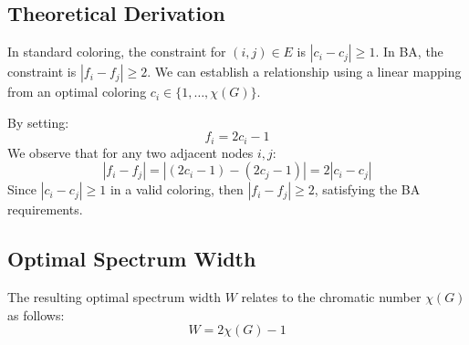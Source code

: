 \documentclass{article}
\begin{document}
\subsection{Theoretical Derivation}
In standard coloring, the constraint for $(i, j) \in E$ is $|c_i - c_j| \ge 1$. In BA, the constraint is $|f_i - f_j| \ge 2$. We can establish a relationship using a linear mapping from an optimal coloring $c_i \in \{1, \dots, \chi(G)\}$.

By setting:
\begin{equation}
    f_i = 2c_i - 1
\end{equation}
We observe that for any two adjacent nodes $i, j$:
\begin{equation}
    |f_i - f_j| = |(2c_i - 1) - (2c_j - 1)| = 2|c_i - c_j|
\end{equation}
Since $|c_i - c_j| \ge 1$ in a valid coloring, then $|f_i - f_j| \ge 2$, satisfying the BA requirements.

\subsection{Optimal Spectrum Width}
The resulting optimal spectrum width $W$ relates to the chromatic number $\chi(G)$ as follows:
\begin{equation}
    W = 2\chi(G) - 1
\end{equation}
\end{document}
